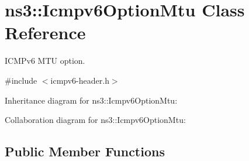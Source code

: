 \hypertarget{classns3_1_1Icmpv6OptionMtu}{}\section{ns3\+:\+:Icmpv6\+Option\+Mtu Class Reference}
\label{classns3_1_1Icmpv6OptionMtu}


I\+C\+M\+Pv6 M\+TU option.  




{\ttfamily \#include $<$icmpv6-\/header.\+h$>$}



Inheritance diagram for ns3\+:\+:Icmpv6\+Option\+Mtu\+:


Collaboration diagram for ns3\+:\+:Icmpv6\+Option\+Mtu\+:
\subsection*{Public Member Functions}
